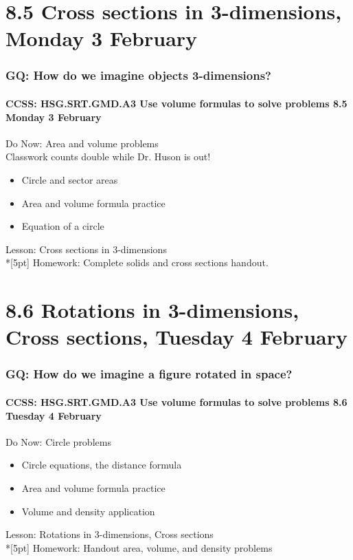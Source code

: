\documentclass{beamer}
\begin{document}
\section{8.5 Cross sections in 3-dimensions, Monday 3 February}
\frame
{
  \frametitle{GQ: How do we imagine objects 3-dimensions?}
  \framesubtitle{CCSS: HSG.SRT.GMD.A3 Use volume formulas to solve problems \hfill \alert{8.5 Monday 3 February}}

  \begin{block}{Do Now: Area and volume problems\\[0.25cm]
    \alert{Classwork counts double while Dr. Huson is out!}}
  \begin{itemize}
    \item Circle and sector areas
    \item Area and volume formula practice
    \item Equation of a circle
  \end{itemize}
  \end{block}
  Lesson: Cross sections in 3-dimensions\\*[5pt]
  Homework: Complete solids and cross sections handout.
}

\section{8.6 Rotations in 3-dimensions, Cross sections, Tuesday 4 February}
\frame
{
  \frametitle{GQ: How do we imagine a figure rotated in space?}
  \framesubtitle{CCSS: HSG.SRT.GMD.A3 Use volume formulas to solve problems \hfill \alert{8.6 Tuesday 4 February}}

  \begin{block}{Do Now: Circle problems}
  \begin{itemize}
    \item Circle equations, the distance formula
    \item Area and volume formula practice
    \item Volume and density application
  \end{itemize}
  \end{block}
  Lesson: Rotations in 3-dimensions, Cross sections\\*[5pt]
  Homework: Handout area, volume, and density problems
}
\end{document}
